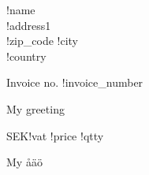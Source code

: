\documentclass{letter}
\date{\today}
\begin{document}
  \begin{letter}{!name \\ !address1 \\ !zip_code !city\\ !country}
    \opening{Invoice no. !invoice_number}
    My greeting
    \begin{invoice}{SEK}{!vat}
       {!price} {!qtty}
    \end{invoice}
    \closing{My åäö}
  \end{letter}
\end{document}

